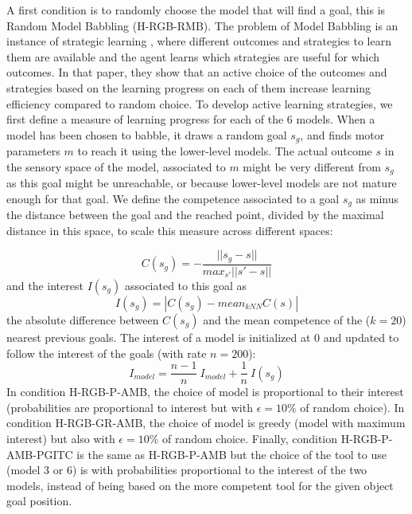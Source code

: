 \documentclass[10pt,letterpaper]{article}
\begin{document}
			A first condition is to randomly choose the model that will find a goal, this is Random Model Babbling (H-RGB-RMB).
			The problem of Model Babbling is an instance of strategic learning \cite{nguyen2012}, 
			where different outcomes and strategies to learn them are available and the agent learns which strategies are useful for which outcomes.
			In that paper, they show that an active choice of the outcomes and strategies based on the learning progress on each of them increase learning efficiency compared to random choice.
			To develop active learning strategies, we first define a measure of learning progress for each of the $6$ models.
			When a model has been chosen to babble, it draws a random goal $s_g$, and finds motor parameters $m$ to reach it using the lower-level models.
			The actual outcome $s$ in the sensory space of the model, associated to $m$ might be very different from $s_g$ as this goal might be unreachable, or because lower-level models are not mature enough for that goal.
			We define the competence associated to a goal $s_g$ as minus the distance between the goal and the reached point, divided by the maximal distance in this space, to scale this measure across different spaces:
			
			\begin{equation}
				C(s_g)=-\frac{||s_g-s||}{max_{s'}||s'-s||}
			\end{equation}
			 and the interest $I(s_g)$ associated to this goal as 
			\begin{equation}
				I(s_g) = |C(s_g) - mean_{kNN}C(s)|
			\end{equation}
			the absolute difference between $C(s_g)$ and the mean competence of the ($k=20$) nearest previous goals.
			The interest of a model is initialized at $0$ and updated to follow the interest of the goals (with rate $n=200$):
			\begin{equation}
				I_{model}=\frac{n-1}{n}~I_{model} + \frac{1}{n}~I(s_g)
			\end{equation}
			In condition H-RGB-P-AMB, the choice of model is proportional to their interest (probabilities are proportional to interest but with $\epsilon=10\%$ of random choice). 
			In condition H-RGB-GR-AMB, the choice of model is greedy (model with maximum interest) but also with $\epsilon=10\%$ of random choice.
			Finally, condition H-RGB-P-AMB-PGITC is the same as H-RGB-P-AMB but the choice of the tool to use (model $3$ or $6$) is with probabilities proportional to the interest of the two models, 
			instead of being based on the more competent tool for the given object goal position.
\end{document}
